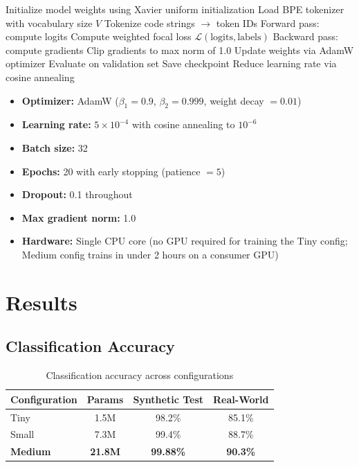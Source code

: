 \documentclass[conference,compsoc]{IEEEtran}
\begin{document}
\begin{algorithm}[h]
\caption{Training procedure}
\label{alg:training}
\begin{algorithmic}[1]
\State Initialize model weights using Xavier uniform initialization
\State Load BPE tokenizer with vocabulary size $V$
        \State Tokenize code strings $\rightarrow$ token IDs
        \State Forward pass: compute logits
        \State Compute weighted focal loss $\mathcal{L}(\text{logits}, \text{labels})$
        \State Backward pass: compute gradients
        \State Clip gradients to max norm of 1.0
        \State Update weights via AdamW optimizer
    \EndFor
    \State Evaluate on validation set
        \State Save checkpoint
    \EndIf
    \State Reduce learning rate via cosine annealing
\EndFor
\end{algorithmic}
\end{algorithm}

\begin{itemize}
    \item \textbf{Optimizer:} AdamW ($\beta_1 = 0.9$, $\beta_2 = 0.999$, weight decay $= 0.01$)
    \item \textbf{Learning rate:} $5 \times 10^{-4}$ with cosine annealing to $10^{-6}$
    \item \textbf{Batch size:} 32
    \item \textbf{Epochs:} 20 with early stopping (patience $= 5$)
    \item \textbf{Dropout:} 0.1 throughout
    \item \textbf{Max gradient norm:} 1.0
    \item \textbf{Hardware:} Single CPU core (no GPU required for training the Tiny config; Medium config trains in under 2 hours on a consumer GPU)
\end{itemize}

\section{Results}
\label{sec:results}

\subsection{Classification Accuracy}

\begin{table}[h]
\centering
\caption{Classification accuracy across configurations}
\label{tab:accuracy}
\begin{tabular}{lccc}
\toprule
\textbf{Configuration} & \textbf{Params} & \textbf{Synthetic Test} & \textbf{Real-World} \\
\midrule
Tiny & 1.5M & 98.2\% & 85.1\% \\
Small & 7.3M & 99.4\% & 88.7\% \\
\textbf{Medium} & \textbf{21.8M} & \textbf{99.88\%} & \textbf{90.3\%} \\
\bottomrule
\end{tabular}
\end{table}
\end{document}
